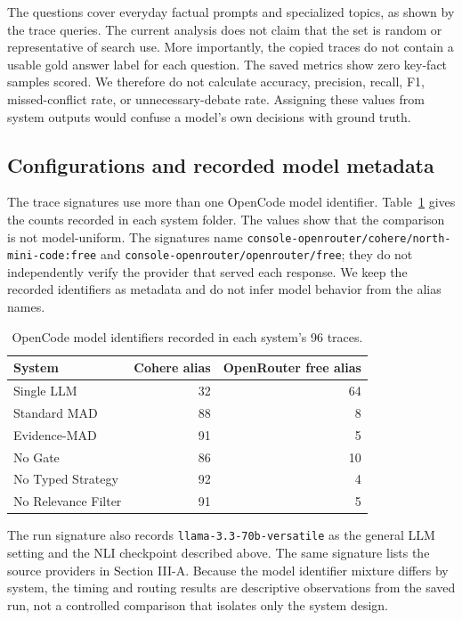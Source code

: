 \documentclass[conference]{IEEEtran}
\begin{document}
The questions cover everyday factual prompts and specialized topics, as shown by the trace queries. The current analysis does not claim that the set is random or representative of search use. More importantly, the copied traces do not contain a usable gold answer label for each question. The saved metrics show zero key-fact samples scored. We therefore do not calculate accuracy, precision, recall, F1, missed-conflict rate, or unnecessary-debate rate. Assigning these values from system outputs would confuse a model's own decisions with ground truth.

\subsection{Configurations and recorded model metadata}
The trace signatures use more than one OpenCode model identifier. Table~\ref{tab:modelmix} gives the counts recorded in each system folder. The values show that the comparison is not model-uniform. The signatures name \texttt{console-openrouter/cohere/north-mini-code:free} and \texttt{console-openrouter/openrouter/free}; they do not independently verify the provider that served each response. We keep the recorded identifiers as metadata and do not infer model behavior from the alias names.

\begin{table}[t]
\centering
\caption{OpenCode model identifiers recorded in each system's 96 traces.}
\label{tab:modelmix}
\scriptsize
\begin{tabular}{lrr}
\toprule
System & Cohere alias & OpenRouter free alias\\
\midrule
Single LLM & 32 & 64\\
Standard MAD & 88 & 8\\
Evidence-MAD & 91 & 5\\
No Gate & 86 & 10\\
No Typed Strategy & 92 & 4\\
No Relevance Filter & 91 & 5\\
\bottomrule
\end{tabular}
\end{table}

The run signature also records \texttt{llama-3.3-70b-versatile} as the general LLM setting and the NLI checkpoint described above. The same signature lists the source providers in Section III-A. Because the model identifier mixture differs by system, the timing and routing results are descriptive observations from the saved run, not a controlled comparison that isolates only the system design.
\end{document}
